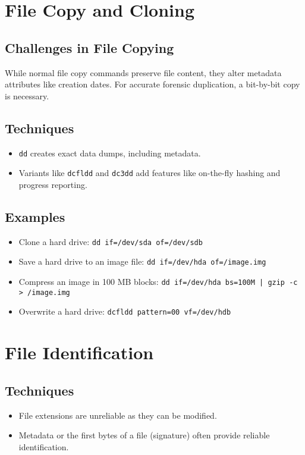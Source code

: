 \section{File Copy and Cloning}
\subsection{Challenges in File Copying}
While normal file copy commands preserve file content, they alter metadata attributes like creation dates. For accurate forensic duplication, a bit-by-bit copy is necessary.
\subsection{Techniques}
\begin{itemize}
    \item \texttt{dd} creates exact data dumps, including metadata.
    \item Variants like \texttt{dcfldd} and \texttt{dc3dd} add features like on-the-fly hashing and progress reporting.
\end{itemize}
\subsection{Examples}
\begin{itemize}
    \item Clone a hard drive: \texttt{dd if=/dev/sda of=/dev/sdb}
    \item Save a hard drive to an image file: \texttt{dd if=/dev/hda of=/image.img}
    \item Compress an image in 100 MB blocks: \texttt{dd if=/dev/hda bs=100M | gzip -c > /image.img}
    \item Overwrite a hard drive: \texttt{dcfldd pattern=00 vf=/dev/hdb}
\end{itemize}

\section{File Identification}
\subsection{Techniques}
\begin{itemize}
    \item File extensions are unreliable as they can be modified.
    \item Metadata or the first bytes of a file (signature) often provide reliable identification.
\end{itemize}
